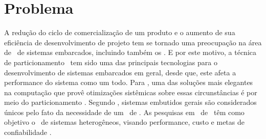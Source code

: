    \section{Problema}
	A redução do ciclo de comercialização de um produto e o aumento de sua eficiência de desenvolvimento de projeto tem se tornado uma preocupação na área de \design\ de sistemas embarcados, incluindo também os \wearables.
	E por este motivo, a técnica de particionamento \hs\ tem sido uma das principais tecnologias para o desenvolvimento de sistemas embarcados em geral, desde que, este afeta a performance do sistema como um todo. 
   Para \citet{Hassine2017}, uma das soluções mais elegantes na computação que provê otimizações sistêmicas sobre essas circunstâncias é por meio do particionamento \hs.
	Segundo \citet{Wolf1994}, sistemas embutidos gerais são considerados únicos pelo fato da necessidade de um \codesign\ de \hs. 
   As pesquisas em \codesign\ de \hs\ têm como objetivo o \design\ de sistemas heterogêneos, visando performance, custo e metas de confiabilidade \citet{Edwards1994}.
	

